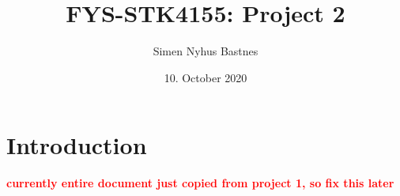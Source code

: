 \documentclass[a4paper]{article}
\title{FYS-STK4155: Project 2}
\author{Simen Nyhus Bastnes}
\date{10. October 2020}
\newcommand\red[1]{\textcolor{red}{\textbf{#1}}}
\begin{document}
\maketitle
\begin{abstract}

\end{abstract}
\section{Introduction}
\red{currently entire document just copied from project 1, so fix this later}
\end{document}
